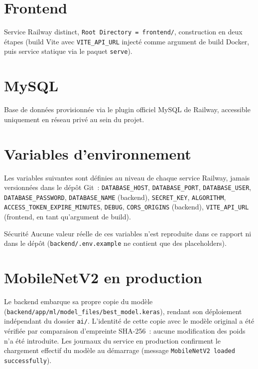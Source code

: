 \section{Frontend}

Service Railway distinct, \texttt{Root Directory = frontend/}, construction en deux \'etapes (build Vite avec \texttt{VITE\_API\_URL} inject\'e comme argument de build Docker, puis service statique via le paquet \texttt{serve}).

\section{MySQL}

Base de donn\'ees provisionn\'ee via le plugin officiel MySQL de Railway, accessible uniquement en r\'eseau priv\'e au sein du projet.

\section{Variables d'environnement}

Les variables suivantes sont d\'efinies au niveau de chaque service Railway, jamais versionn\'ees dans le d\'ep\^ot Git~: \texttt{DATABASE\_HOST}, \texttt{DATABASE\_PORT}, \texttt{DATABASE\_USER}, \texttt{DATABASE\_PASSWORD}, \texttt{DATABASE\_NAME} (backend), \texttt{SECRET\_KEY}, \texttt{ALGORITHM}, \texttt{ACCESS\_TOKEN\_EXPIRE\_MINUTES}, \texttt{DEBUG}, \texttt{CORS\_ORIGINS} (backend), \texttt{VITE\_API\_URL} (frontend, en tant qu'argument de build).

\begin{noteflag}{S\'ecurit\'e}
Aucune valeur r\'eelle de ces variables n'est reproduite dans ce rapport ni dans le d\'ep\^ot (\texttt{backend/.env.example} ne contient que des placeholders).
\end{noteflag}

\section{MobileNetV2 en production}

Le backend embarque sa propre copie du mod\`ele (\texttt{backend/app/ml/model\_files/best\_model.keras}), rendant son d\'eploiement ind\'ependant du dossier \texttt{ai/}. L'identit\'e de cette copie avec le mod\`ele original a \'et\'e v\'erifi\'ee par comparaison d'empreinte SHA-256~: aucune modification des poids n'a \'et\'e introduite. Les journaux du service en production confirment le chargement effectif du mod\`ele au d\'emarrage (message \texttt{MobileNetV2 loaded successfully}).

